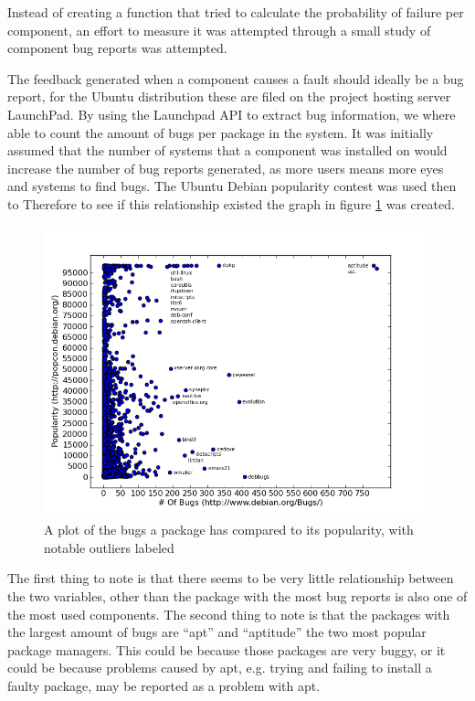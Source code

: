 Instead of creating a function that tried to calculate the probability of failure per component,
an effort to measure it was attempted through a small study of component bug reports was attempted.

The feedback generated when a component causes a fault should ideally be a bug report, for the Ubuntu distribution these are filed on the project hosting server LaunchPad.
By using the Launchpad API to extract bug information, we where able to count the amount of bugs per package in the system.
It was initially assumed that the number of systems that a component was installed on would increase the number of bug reports generated,
as more users means more eyes and systems to find bugs.
The Ubuntu Debian popularity contest was used then to  
Therefore to see if this relationship existed the graph in figure \ref{bugsvspop} was created.

\begin{figure}[htp]
\begin{center}
  \includegraphics[width=\textwidth]{simulationpics/bugsvspopularity}
  \caption[Bugs v.s. Popularity]{A plot of the bugs a package has compared to its popularity, with notable outliers labeled}
  \label{bugsvspop}
\end{center}
\end{figure}

The first thing to note is that there seems to be very little relationship between the two variables, other than the package with the most bug reports is also one of the most used components.
The second thing to note is that the packages with the largest amount of bugs are ``apt'' and ``aptitude'' the two most popular package managers.
This could be because those packages are very buggy, or it could be because problems caused by apt, e.g. trying and failing to install a faulty package, may be reported as a problem with apt.

